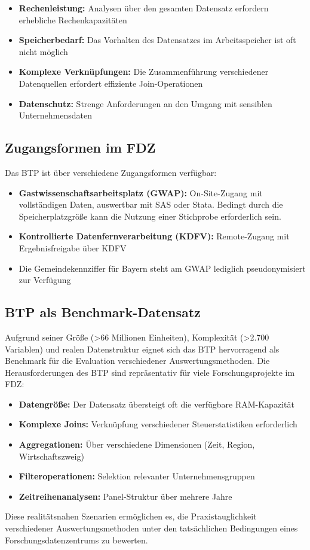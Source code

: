 \documentclass[
  german,
  10pt,
  twoside]{article}
\providecommand{\tightlist}{%
  \setlength{\itemsep}{0pt}\setlength{\parskip}{0pt}}
\begin{document}
\begin{itemize}
\tightlist
\item
  \textbf{Rechenleistung:} Analysen über den gesamten Datensatz
  erfordern erhebliche Rechenkapazitäten
\item
  \textbf{Speicherbedarf:} Das Vorhalten des Datensatzes im
  Arbeitsspeicher ist oft nicht möglich
\item
  \textbf{Komplexe Verknüpfungen:} Die Zusammenführung verschiedener
  Datenquellen erfordert effiziente Join-Operationen
\item
  \textbf{Datenschutz:} Strenge Anforderungen an den Umgang mit
  sensiblen Unternehmensdaten
\end{itemize}

\subsection{Zugangsformen im FDZ}\label{zugangsformen-im-fdz}

Das BTP ist über verschiedene Zugangsformen verfügbar:

\begin{itemize}
\tightlist
\item
  \textbf{Gastwissenschaftsarbeitsplatz (GWAP):} On-Site-Zugang mit
  vollständigen Daten, auswertbar mit SAS oder Stata. Bedingt durch die
  Speicherplatzgröße kann die Nutzung einer Stichprobe erforderlich
  sein.
\item
  \textbf{Kontrollierte Datenfernverarbeitung (KDFV):} Remote-Zugang mit
  Ergebnisfreigabe über KDFV
\item
  Die Gemeindekennziffer für Bayern steht am GWAP lediglich
  pseudonymisiert zur Verfügung
\end{itemize}

\subsection{BTP als
Benchmark-Datensatz}\label{btp-als-benchmark-datensatz}

Aufgrund seiner Größe (\textgreater66 Millionen Einheiten), Komplexität
(\textgreater2.700 Variablen) und realen Datenstruktur eignet sich das
BTP hervorragend als Benchmark für die Evaluation verschiedener
Auswertungsmethoden. Die Herausforderungen des BTP sind repräsentativ
für viele Forschungsprojekte im FDZ:

\begin{itemize}
\tightlist
\item
  \textbf{Datengröße:} Der Datensatz übersteigt oft die verfügbare
  RAM-Kapazität
\item
  \textbf{Komplexe Joins:} Verknüpfung verschiedener Steuerstatistiken
  erforderlich\\
\item
  \textbf{Aggregationen:} Über verschiedene Dimensionen (Zeit, Region,
  Wirtschaftszweig)
\item
  \textbf{Filteroperationen:} Selektion relevanter Unternehmensgruppen
\item
  \textbf{Zeitreihenanalysen:} Panel-Struktur über mehrere Jahre
\end{itemize}

Diese realitätsnahen Szenarien ermöglichen es, die Praxistauglichkeit
verschiedener Auswertungsmethoden unter den tatsächlichen Bedingungen
eines Forschungsdatenzentrums zu bewerten.


\printbibliography
\end{document}
